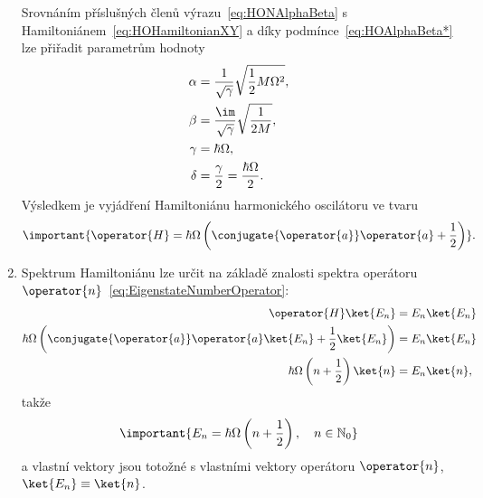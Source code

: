 \begin{solution}
\begin{enumerate}
		Srovnáním příslušných členů výrazu~\eqref{eq:HONAlphaBeta} s Hamiltoniánem~\eqref{eq:HOHamiltonianXY}
        a díky podmínce~\eqref{eq:HOAlphaBeta*} lze přiřadit parametrům hodnoty
        \begin{subequations}
            \begin{align}
                \alpha
                    &=\frac{1}{\sqrt{\gamma}}\sqrt{\frac{1}{2}M\Omega^{2}},\\
                \beta
                    &=\frac{\im}{\sqrt{\gamma}}\sqrt{\frac{1}{2M}},\\
                \gamma
                    &=\hbar\Omega,\\
                \delta
                    &=\frac{\gamma}{2}=\frac{\hbar\Omega}{2}.			
            \end{align}
			\label{eq:HOAlphaBeta}
        \end{subequations}
		Výsledkem je vyjádření Hamiltoniánu harmonického oscilátoru ve tvaru
		\begin{equation}
			\important{\operator{H}=\hbar\Omega\left(\conjugate{\operator{a}}\operator{a}+\frac{1}{2}\right)}.
            \label{eq:HOHamiltonianAA+}
    	\end{equation}
		
	\item
		Spektrum Hamiltoniánu lze určit na základě znalosti spektra operátoru $\operator{n}$~\eqref{eq:EigenstateNumberOperator}:
		\begin{align}
            \operator{H}\ket{E_{n}}
                &=E_{n}\ket{E_{n}}\nonumber\\
			\hbar\Omega\left(\conjugate{\operator{a}}\operator{a}\ket{E_{n}}+\frac{1}{2}\ket{E_{n}}\right)
				&=E_{n}\ket{E_{n}}\nonumber\\
            \hbar\Omega\left(n+\frac{1}{2}\right)\ket{n}
                &=E_{n}\ket{n},
		\end{align}
		takže
		\begin{equation}
            \important{E_{n}
                =\hbar\Omega\left(n+\frac{1}{2}\right),\quad n\in\mathbb{N}_{0}
            }
            \label{eq:HOEnergy}
    	\end{equation}
		a vlastní vektory jsou totožné s vlastními vektory operátoru $\operator{n}$, $\ket{E_{n}}\equiv\ket{n}$.
	

\end{enumerate}
\end{solution}
